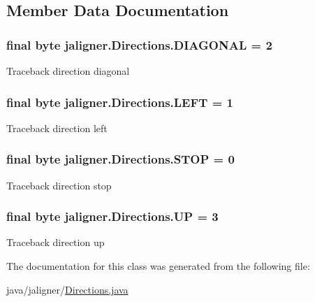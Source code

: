 \subsection{Member Data Documentation}
\hypertarget{classjaligner_1_1_directions_a9f723e9707ba7ca711e90767ecb5cf14}{
\subsubsection[{D\+I\+A\+G\+O\+N\+A\+L}]{\setlength{\rightskip}{0pt plus 5cm}final byte jaligner.\+Directions.\+D\+I\+A\+G\+O\+N\+A\+L = 2\hspace{0.3cm}{\ttfamily [static]}}}\label{classjaligner_1_1_directions_a9f723e9707ba7ca711e90767ecb5cf14}
Traceback direction diagonal \hypertarget{classjaligner_1_1_directions_a3801d5f4bc1ebfc890758da247698bf0}{
\subsubsection[{L\+E\+F\+T}]{\setlength{\rightskip}{0pt plus 5cm}final byte jaligner.\+Directions.\+L\+E\+F\+T = 1\hspace{0.3cm}{\ttfamily [static]}}}\label{classjaligner_1_1_directions_a3801d5f4bc1ebfc890758da247698bf0}
Traceback direction left \hypertarget{classjaligner_1_1_directions_a24db3cae78d4158c169ebdd937bff01a}{
\subsubsection[{S\+T\+O\+P}]{\setlength{\rightskip}{0pt plus 5cm}final byte jaligner.\+Directions.\+S\+T\+O\+P = 0\hspace{0.3cm}{\ttfamily [static]}}}\label{classjaligner_1_1_directions_a24db3cae78d4158c169ebdd937bff01a}
Traceback direction stop \hypertarget{classjaligner_1_1_directions_ab655b12c1886668fffbe8e75db80bea2}{
\subsubsection[{U\+P}]{\setlength{\rightskip}{0pt plus 5cm}final byte jaligner.\+Directions.\+U\+P = 3\hspace{0.3cm}{\ttfamily [static]}}}\label{classjaligner_1_1_directions_ab655b12c1886668fffbe8e75db80bea2}
Traceback direction up 

The documentation for this class was generated from the following file\+:\begin{DoxyCompactItemize}
\item 
java/jaligner/\hyperlink{_directions_8java}{Directions.\+java}\end{DoxyCompactItemize}
